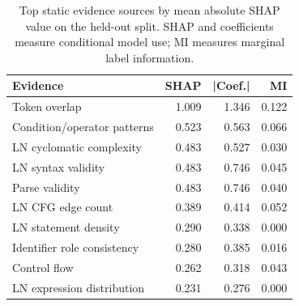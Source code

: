 \begin{table}
\caption{Top static evidence sources by mean absolute SHAP value on the held-out split. SHAP and coefficients measure conditional model use; MI measures marginal label information.}
\label{tab:shap-comparison}
\begin{tabular}{lrrr}
\toprule
Evidence & SHAP & |Coef.| & MI \\
\midrule
Token overlap & 1.009 & 1.346 & 0.122 \\
Condition/operator patterns & 0.523 & 0.563 & 0.066 \\
LN cyclomatic complexity & 0.483 & 0.527 & 0.030 \\
LN syntax validity & 0.483 & 0.746 & 0.045 \\
Parse validity & 0.483 & 0.746 & 0.040 \\
LN CFG edge count & 0.389 & 0.414 & 0.052 \\
LN statement density & 0.290 & 0.338 & 0.000 \\
Identifier role consistency & 0.280 & 0.385 & 0.016 \\
Control flow & 0.262 & 0.318 & 0.043 \\
LN expression distribution & 0.231 & 0.276 & 0.000 \\
\bottomrule
\end{tabular}
\end{table}
